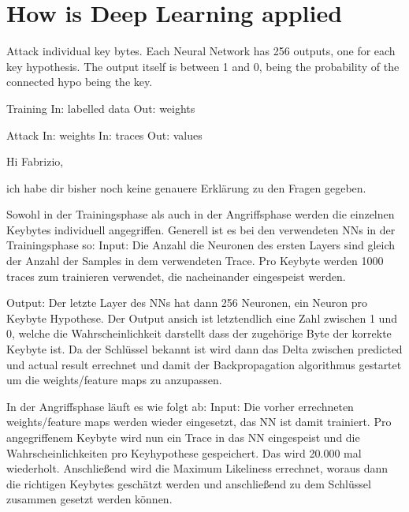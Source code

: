 

\section{How is Deep Learning applied}
Attack individual key bytes.
Each Neural Network has 256 outputs, one for each key hypothesis.
The output itself is between 1 and 0, being the probability of the connected hypo being the key.

Training
In: labelled data
Out: weights

Attack
In: weights
In: traces
Out: values

Hi Fabrizio,

ich habe dir bisher noch keine genauere Erklärung zu den Fragen gegeben.

Sowohl in der Trainingsphase als auch in der Angriffsphase werden die einzelnen Keybytes individuell angegriffen.
Generell ist es bei den verwendeten NNs in der Trainingsphase so:
Input:
Die Anzahl die Neuronen des ersten Layers sind gleich der Anzahl der Samples in dem verwendeten Trace.
Pro Keybyte werden 1000 traces zum trainieren verwendet, die nacheinander eingespeist werden.

Output: 
Der letzte Layer des NNs hat dann 256 Neuronen, ein Neuron pro Keybyte Hypothese.
Der Output ansich ist letztendlich eine Zahl zwischen 1 und 0, welche die Wahrscheinlichkeit darstellt dass der zugehörige Byte der korrekte Keybyte ist.
Da der Schlüssel bekannt ist wird dann das Delta zwischen predicted und actual result errechnet und damit der Backpropagation algorithmus gestartet um die weights/feature maps zu anzupassen.


In der Angriffsphase läuft es wie folgt ab:
Input: 
Die vorher errechneten weights/feature maps werden wieder eingesetzt, das NN ist damit trainiert.
Pro angegriffenem Keybyte wird nun ein Trace in das NN eingespeist und die Wahrscheinlichkeiten pro Keyhypothese gespeichert. Das wird 20.000 mal wiederholt. Anschließend wird die Maximum Likeliness errechnet, woraus dann die richtigen Keybytes geschätzt werden und anschließend zu dem Schlüssel zusammen gesetzt werden können.


